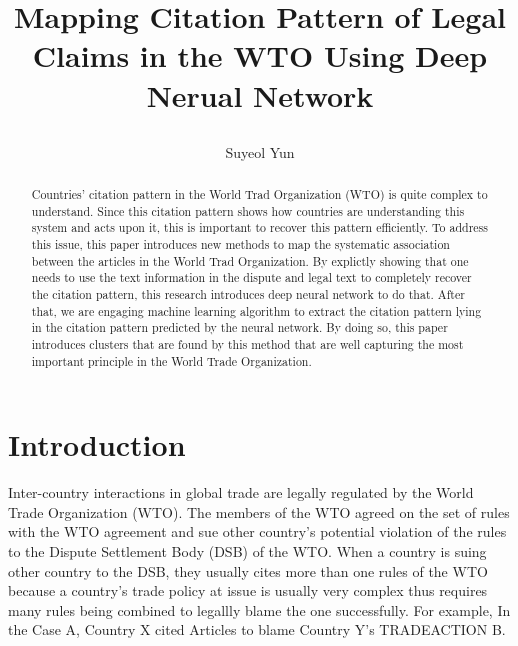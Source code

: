 \documentclass[12pt,letterpaper]{article}
\newcommand{\tit}{
\bf 
Mapping Citation Pattern of Legal Claims in the WTO Using Deep Nerual Network
}
\newcommand\spacingset[1]{\renewcommand{\baselinestretch}
{#1}\small\normalsize}
\begin{document}
\spacingset{1.25}

\setcounter{page}{0}
\vspace{-.1in}

{\title{
    \tit
  }
  \author{Suyeol Yun
  }
  \maketitle
}

\thispagestyle{empty}
\vspace{-.1in}

\begin{abstract}

  Countries' citation pattern in the World Trad Organization (WTO) is quite complex to understand. 
  Since this citation pattern shows how countries are understanding this system and acts upon it,
  this is important to recover this pattern efficiently. To address this issue, this paper introduces new methods to map the systematic association between the articles in the World Trad Organization.
  By explictly showing that one needs to use the text information in the dispute and legal text to completely recover the citation pattern,
  this research introduces deep neural network to do that.
  After that, we are engaging machine learning algorithm to extract the citation pattern lying in the citation pattern predicted by the neural network. By doing so, this paper introduces clusters that are found by this method that are well capturing the most important principle in the World Trade Organization.

\end{abstract}

\spacingset{1.5} %

\section{Introduction}

Inter-country interactions in global trade are legally regulated by the World Trade Organization (WTO).
The members of the WTO agreed on the set of rules with the WTO agreement and sue other country's potential
violation of the rules to the Dispute Settlement Body (DSB) of the WTO.
When a country is suing other country to the DSB, they usually cites more than one rules of the WTO
because a country's trade policy at issue is usually very complex thus requires many rules being combined to legallly blame the one successfully.
For example, In the Case A, Country X cited {Articles} to blame Country Y's TRADEACTION B.
\end{document}
